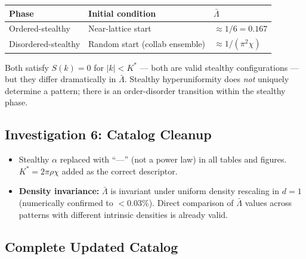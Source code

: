\documentclass[11pt,letterpaper]{article}
\begin{document}
\begin{table}[H]\centering
\begin{tabular}{lll}
\toprule
\textbf{Phase} & \textbf{Initial condition} & $\bar\Lambda$ \\
\midrule
Ordered-stealthy & Near-lattice start & $\approx 1/6 = 0.167$ \\
Disordered-stealthy & Random start (collab ensemble) & $\approx 1/(\pi^2\chi)$ \\
\bottomrule
\end{tabular}
\end{table}

Both satisfy $S(k)=0$ for $|k|<K^*$ --- both are valid stealthy configurations ---
but they differ dramatically in $\bar\Lambda$. Stealthy hyperuniformity does \emph{not}
uniquely determine a pattern; there is an order-disorder transition within the stealthy phase.

\subsection{Investigation 6: Catalog Cleanup}

\begin{itemize}[leftmargin=1.5em]
  \item Stealthy $\alpha$ replaced with ``---'' (not a power law) in all tables and figures.
    $K^*=2\pi\rho\chi$ added as the correct descriptor.
  \item \textbf{Density invariance:} $\bar\Lambda$ is invariant under uniform density rescaling
    in $d=1$ (numerically confirmed to $<0.03\%$). Direct comparison of $\bar\Lambda$
    values across patterns with different intrinsic densities is already valid.
\end{itemize}

\subsection{Complete Updated Catalog}
\end{document}
